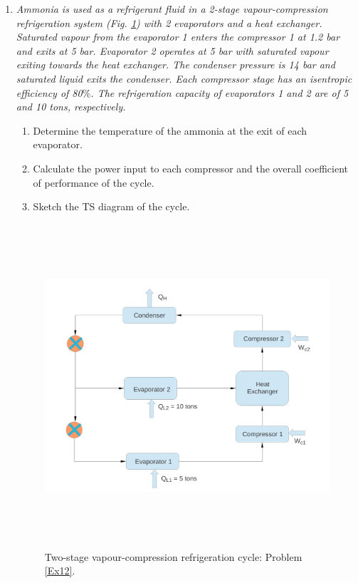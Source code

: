 \begin{enumerate}
\item \label{Ex12} {\it Ammonia is used as a refrigerant fluid in a 2-stage vapour-compression refrigeration system (Fig. \ref{Ex12:Fig}) with 2 evaporators and a heat exchanger. Saturated vapour from the evaporator 1 enters the compressor 1 at 1.2 bar and exits at 5 bar. Evaporator 2 operates at 5 bar with saturated vapour exiting towards the heat exchanger. The condenser pressure is 14 bar and saturated liquid exits the condenser. Each compressor stage has an isentropic efficiency of 80$\%$. The refrigeration capacity of evaporators 1 and 2 are of 5 and 10 tons, respectively. 
\begin{enumerate}
 \item Determine the temperature of the ammonia at the exit of each evaporator.
 \item Calculate the power input to each compressor and the overall coefficient of performance of the cycle.
 \item Sketch the TS diagram of the cycle.
\end{enumerate}

}

\begin{figure}[h]
\begin{center}
\includegraphics[width=16.0cm,height=12.0cm]{./Pics/Overview_Refrig41}
\end{center}
\caption{Two-stage vapour-compression refrigeration cycle: Problem \ref{Ex12}.}\label{Ex12:Fig}
\end{figure}





\end{enumerate}
